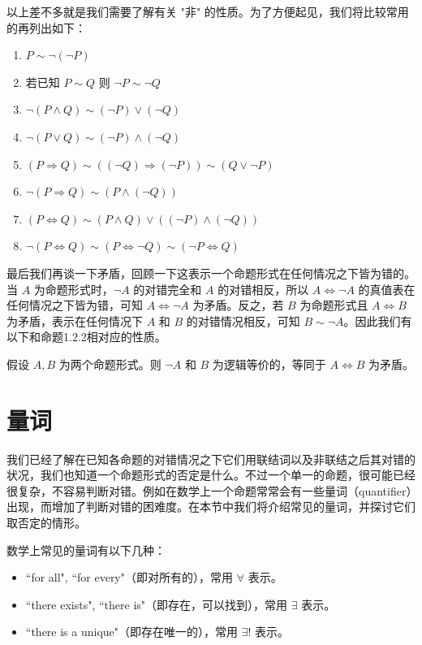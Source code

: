 以上差不多就是我们需要了解有关 "非" 的性质。为了方便起见，我们将比较常用的再列出如下：
\begin{enumerate}
    \item \(P\sim \neg(\neg P)\)
    \item 若已知 \(P\sim Q\) 则 \(\neg P\sim \neg Q\)
    \item \(\neg (P\land Q)\sim (\neg P)\lor (\neg Q)\)
    \item \(\neg (P\lor Q)\sim (\neg P)\land (\neg Q)\)
    \item \((P\Rightarrow Q)\sim ((\neg Q)\Rightarrow (\neg P))\sim (Q\lor \neg P)\)
    \item \(\neg (P\Rightarrow Q)\sim (P\land (\neg Q))\)
    \item \((P\Leftrightarrow Q)\sim (P\land Q)\lor ((\neg P)\land (\neg Q))\)
    \item \(\neg (P\Leftrightarrow Q)\sim (P\Leftrightarrow \neg Q)\sim (\neg P\Leftrightarrow Q)\)
\end{enumerate}

最后我们再谈一下矛盾，回顾一下这表示一个命题形式在任何情况之下皆为错的。当 \(A\) 为命题形式时，\(\neg A\) 的对错完全和 \(A\) 的对错相反，所以 \(A\Leftrightarrow \neg A\) 的真值表在任何情况之下皆为错，可知 \(A\Leftrightarrow \neg A\) 为矛盾。反之，若 \(B\) 为命题形式且 \(A\Leftrightarrow B\) 为矛盾，表示在任何情况下 \(A\) 和 \(B\) 的对错情况相反，可知 \(B\sim \neg A\)。因此我们有以下和命题1.2.2相对应的性质。

\begin{proposition}
假设 \(A, B\) 为两个命题形式。则 \(\neg A\) 和 \(B\) 为逻辑等价的，等同于 \(A\Leftrightarrow B\) 为矛盾。
\end{proposition}

\section{量词}

我们已经了解在已知各命题的对错情况之下它们用联结词以及非联结之后其对错的状况，我们也知道一个命题形式的否定是什么。不过一个单一的命题，很可能已经很复杂，不容易判断对错。例如在数学上一个命题常常会有一些量词（quantifier）出现，而增加了判断对错的困难度。在本节中我们将介绍常见的量词，并探讨它们取否定的情形。

数学上常见的量词有以下几种：
\begin{itemize}
    \item ``for all", ``for every"（即对所有的），常用 \(\forall\) 表示。
    \item ``there exists", ``there is"（即存在，可以找到），常用 \(\exists\) 表示。
    \item ``there is a unique"（即存在唯一的），常用 \(\exists !\) 表示。
\end{itemize}

